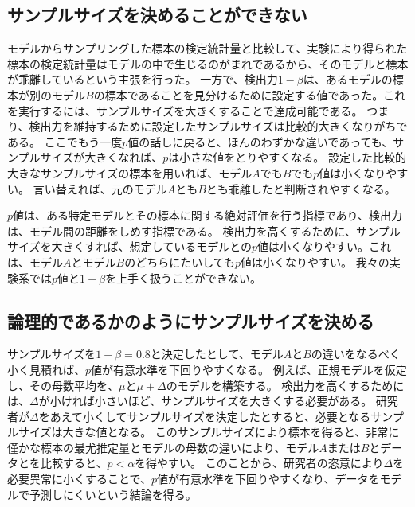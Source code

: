 
\subsection{サンプルサイズを決めることができない}
モデルからサンプリングした標本の検定統計量と比較して、実験により得られた標本の検定統計量はモデルの中で生じるのがまれであるから、そのモデルと標本が乖離しているという主張を行った。
一方で、検出力$1-\beta$は、あるモデルの標本が別のモデル$B$の標本であることを見分けるために設定する値であった。これを実行するには、サンプルサイズを大きくすることで達成可能である。
つまり、検出力を維持するために設定したサンプルサイズは比較的大きくなりがちである。
ここでもう一度$p$値の話しに戻ると、ほんのわずかな違いであっても、サンプルサイズが大きくなれば、$p$は小さな値をとりやすくなる。
設定した比較的大きなサンプルサイズの標本を用いれば、モデル$A$でも$B$でも$p$値は小くなりやすい。
言い替えれば、元のモデル$A$とも$B$とも乖離したと判断されやすくなる。


$p$値は、ある特定モデルとその標本に関する絶対評価を行う指標であり、検出力は、モデル間の距離をしめす指標である。
検出力を高くするために、サンプルサイズを大きくすれば、想定しているモデルとの$p$値は小くなりやすい。これは、モデル$A$とモデル$B$のどちらにたいしても$p$値は小くなりやすい。
我々の実験系では$p$値と$1-\beta$を上手く扱うことができない。
\fi

\subsection{論理的であるかのようにサンプルサイズを決める}
サンプルサイズを$1-\beta=0.8$と決定したとして、モデル$A$と$B$の違いをなるべく小く見積れば、$p$値が有意水準を下回りやすくなる。
例えば、正規モデルを仮定し、その母数平均を、$\mu$と$\mu+\Delta$のモデルを構築する。
検出力を高くするためには、$\Delta$が小ければ小さいほど、サンプルサイズを大きくする必要がある。
研究者が$\Delta$をあえて小くしてサンプルサイズを決定したとすると、必要となるサンプルサイズは大きな値となる。
このサンプルサイズにより標本を得ると、非常に僅かな標本の最尤推定量とモデルの母数の違いにより、モデル$A$または$B$とデータとを比較すると、$p<\alpha$を得やすい。
このことから、研究者の恣意により$\Delta$を必要異常に小くすることで、$p$値が有意水準を下回りやすくなり、データをモデルで予測しにくいという結論を得る。

